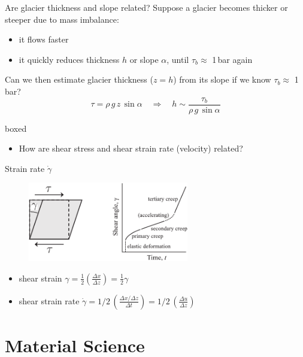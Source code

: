 \documentclass[hide notes,intlimits]{beamer}
\begin{document}
\begin{frame}{Are glacier thickness and slope related?}
  Suppose a glacier becomes thicker or steeper due to mass imbalance:
  \begin{itemize}
    \item it flows faster
    \item it quickly reduces thickness $h$ or slope $\alpha$, until $\tau_{b} \approx$ 1\,bar again
  \end{itemize}
  Can we then estimate glacier thickness ($z=h$) from its slope if we know $\tau_{b} \approx$ 1\,bar?
  \begin{displaymath}
    \tau = \rho\,g\,z\,\sin{\alpha} \quad \Rightarrow \quad h \sim \frac{\tau_{b}}{\rho\,g\,\sin{\alpha}}
  \end{displaymath}
   \begin{beamercolorbox}[rounded=true,shadow=true]{boxed}
      \begin{itemize}
       \item How are shear stress and shear strain rate (velocity) related?
       \end{itemize}
  \end{beamercolorbox}
\end{frame}


\begin{frame}{Strain rate $\dot\gamma$}
  \begin{figure}
  \includegraphics[width=7cm]{figures/fig_4_04}
  \end{figure}
  \begin{itemize}
  \item shear strain $\gamma = \frac{1}{2}\left( \frac{\Delta x}{\Delta z}\right) = \frac{1}{2} \gamma$
  \item shear strain rate $\dot \gamma = 1/2\,\left( \frac{\Delta x / \Delta z}{\Delta t}\right) = 1/2\,\left( \frac{\Delta u}{\Delta z}\right)$
  \end{itemize}
\end{frame}

\section{Material Science}
\end{document}
